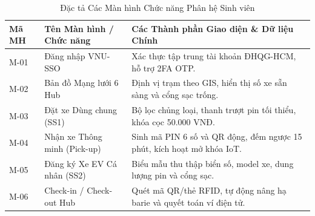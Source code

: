 \documentclass[12pt,a4paper]{article}
\begin{document}
\begin{table}[H]
    \centering
    \small
    \renewcommand{\arraystretch}{1.2}
    \caption{Đặc tả Các Màn hình Chức năng Phân hệ Sinh viên}
    \label{tab:ui-student-screens}
    \begin{tabularx}{\textwidth}{|l|l|X|}
        \hline
        \textbf{Mã MH} & \textbf{Tên Màn hình / Chức năng} & \textbf{Các Thành phần Giao diện \& Dữ liệu Chính} \\
        \hline
        M-01 & Đăng nhập VNU-SSO & Xác thực tập trung tài khoản ĐHQG-HCM, hỗ trợ 2FA OTP. \\
        \hline
        M-02 & Bản đồ Mạng lưới 6 Hub & Định vị trạm theo GIS, hiển thị số xe sẵn sàng và cổng sạc trống. \\
        \hline
        M-03 & Đặt xe Dùng chung (SS1) & Bộ lọc chủng loại, thanh trượt pin tối thiểu, khóa cọc 50.000 VNĐ. \\
        \hline
        M-04 & Nhận xe Thông minh (Pick-up) & Sinh mã PIN 6 số và QR động, đếm ngược 15 phút, kích hoạt mở khóa IoT. \\
        \hline
        M-05 & Đăng ký Xe EV Cá nhân (SS2) & Biểu mẫu thu thập biển số, model xe, dung lượng pin và cổng sạc. \\
        \hline
        M-06 & Check-in / Check-out Hub & Quét mã QR/thẻ RFID, tự động nâng hạ barie và quyết toán ví điện tử. \\
        \hline
    \end{tabularx}
\end{table}

\clearpage
\end{document}
